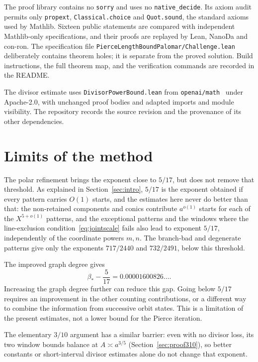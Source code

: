 \documentclass[11pt]{article}
\theoremstyle{definition}
\theoremstyle{remark}
\newcommand{\lean}[1]{\nolinkurl{#1}}
\begin{document}
The proof library contains no \lean{sorry} and uses no \lean{native_decide}.
Its axiom audit permits only \lean{propext}, \lean{Classical.choice} and
\lean{Quot.sound}, the standard axioms used by Mathlib. Sixteen public
statements are compared with independent Mathlib-only specifications, and
their proofs are replayed by Lean, NanoDa and con-ron. The specification
file \lean{PierceLengthBoundPalomar/Challenge.lean} deliberately contains theorem holes; it is
separate from the proved solution. Build instructions, the full theorem
map, and the verification commands are recorded in the README.

The divisor estimate uses \lean{DivisorPowerBound.lean} from
\lean{openai/math}~\cite{OAIMath} under Apache-2.0, with unchanged proof
bodies and adapted imports and module visibility. The repository records
the source revision and the provenance of its other dependencies.

\section{Limits of the method}\label{sec:limits}

The polar refinement brings the exponent close to $5/17$, but does not
remove that threshold. As explained in Section~\ref{sec:intro}, $5/17$ is the
exponent obtained if every pattern carries $O(1)$ starts, and the estimates
here never do better than that: the non-retained components and conics contribute
$a^{o(1)}$ starts for each of the $X^{5+o(1)}$ patterns, and the exceptional patterns and
the windows where the line-exclusion condition~\eqref{eq:jointscale} fails
also lead to exponent $5/17$, independently of the coordinate powers $m,n$.
The branch-bad and degenerate patterns give only the exponents
$717/2440$ and $732/2491$, below this threshold.

The improved graph degree gives
\[
 \beta_*-\frac5{17}=0.00001600826\ldots.
\]
Increasing the graph degree further can reduce this gap. Going below
$5/17$ requires an improvement in the other counting contributions, or a
different way to combine the information from successive orbit states.
This is a limitation of the present estimates, not a lower bound for the
Pierce iteration.

The elementary $3/10$ argument has a similar barrier: even with no divisor
loss, its two window bounds balance at $A\asymp a^{3/5}$
(Section~\ref{sec:proof310}), so better constants or short-interval divisor
estimates alone do not change that exponent.
\end{document}
